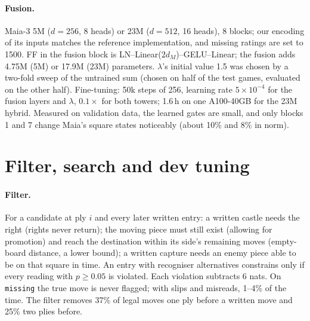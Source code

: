 \documentclass[11pt]{article}
\begin{document}
\paragraph{Fusion.} Maia-3 5M ($d=256$, 8 heads) or 23M ($d=512$, 16 heads), 8 blocks; our encoding of its inputs matches the reference implementation, and missing ratings are set to 1500. FF in the fusion block is LN--Linear($2d_M$)--GELU--Linear; the fusion adds 4.75M (5M) or 17.9M (23M) parameters. $\lambda$'s initial value 1.5 was chosen by a two-fold sweep of the untrained sum (chosen on half of the test games, evaluated on the other half). Fine-tuning: 50k steps of 256, learning rate $5\times10^{-4}$ for the fusion layers and $\lambda$, $0.1\times$ for both towers; 1.6\,h on one A100-40GB for the 23M hybrid. Measured on validation data, the learned gates are small, and only blocks 1 and 7 change Maia's square states noticeably (about 10\% and 8\% in norm).

\section{Filter, search and dev tuning}
\label{app:search}
\paragraph{Filter.} For a candidate at ply $i$ and every later written entry: a written castle needs the right (rights never return); the moving piece must still exist (allowing for promotion) and reach the destination within its side's remaining moves (empty-board distance, a lower bound); a written capture needs an enemy piece able to be on that square in time. An entry with recogniser alternatives constrains only if every reading with $p\ge0.05$ is violated. Each violation subtracts 6 nats. On \texttt{missing} the true move is never flagged; with slips and misreads, 1--4\% of the time. The filter removes 37\% of legal moves one ply before a written move and 25\% two plies before.
\end{document}
